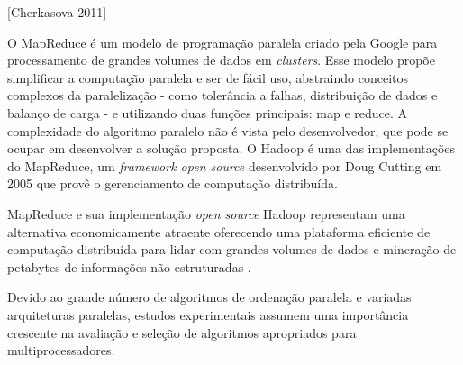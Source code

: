  
 [Cherkasova 2011]
 
 
 
O MapReduce\citep{Dean:2008}  é um modelo de programação paralela criado pela Google para processamento de grandes volumes de dados em \textit{clusters}. Esse modelo propõe simplificar a computação paralela e ser de fácil uso, abstraindo conceitos complexos da paralelização - como tolerância a falhas, distribuição de dados e balanço de carga - e utilizando duas funções principais: map e reduce. A complexidade do algoritmo paralelo não é vista pelo desenvolvedor, que pode se ocupar em desenvolver a solução proposta. O Hadoop \citep{Hadoop:2010} é uma das implementações do MapReduce, um \textit{framework open source } desenvolvido por Doug Cutting em 2005 que provê o gerenciamento de computação distribuída. %


MapReduce e sua implementação \textit{open source} Hadoop representam uma alternativa economicamente atraente oferecendo uma plataforma eficiente de computação distribuída para lidar com grandes volumes de dados e mineração de petabytes de informações não estruturadas \citep{Cherkasova:2011}.

Devido ao grande número de algoritmos de ordenação paralela e variadas arquiteturas paralelas, estudos experimentais assumem uma importância crescente na avaliação e seleção de algoritmos apropriados para multiprocessadores.
